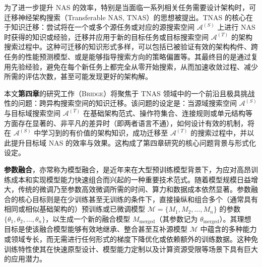 \documentclass[../main.tex]{subfiles}
\begin{document}
为了进一步提升 NAS 的效率，特别是当面临一系列相关任务需要设计架构时，可迁移神经架构搜索（Transferable NAS, TNAS）的思想被提出。TNAS 的核心在于知识迁移：尝试将在一个或多个源任务或对应的源搜索空间 $\mathcal{A}^{(S)}$ 上进行 NAS 时获得的知识或经验，迁移并应用于新的目标任务或目标搜索空间 $\mathcal{A}^{(T)}$ 的架构搜索过程中。这种可迁移的知识形式多样，可以包括已被验证有效的架构构件、跨任务的性能预测模型、或是能够指导搜索方向的策略偏置等。其最终目的是通过复用先验经验，避免在每个新任务上都完全从零开始搜索，从而加速收敛过程、减少所需的评估次数，甚至可能发现更好的架构解。

本文\textbf{第四章}的研究工作（\textsc{Bridge}）将聚焦于 TNAS 领域中的一个前沿且极具挑战性的问题：跨异构搜索空间的知识迁移。该问题的设定是：当源域搜索空间 $\mathcal{A}^{(S)}$ 与目标域搜索空间 $\mathcal{A}^{(T)}$ 在基础架构范式、操作符集合、连接规则或单元结构等方面存在显著的、非平凡的差异时（即两者语言不通），如何设计有效的机制，将在 $\mathcal{A}^{(S)}$ 中学习到的有价值的架构知识，成功迁移至 $\mathcal{A}^{(T)}$ 的搜索过程中，并以此提升目标域 NAS 的效率与效果。这构成了第四章研究的核心问题背景与形式化设定。


\textbf{参数融合}，亦常称为模型融合，是近年来在大型预训练模型背景下，为应对高昂训练成本和实现模型能力快速组合而兴起的一种重要技术范式。随着模型规模日益增大，传统的微调乃至参数高效微调所需的时间、算力和数据成本依然显著。参数融合的核心目标则是在少训练甚至无训练的条件下，直接操纵和组合多个（通常具有相同或相似基础架构的）预训练或已微调模型 $\mathcal{M} = \{M_1, M_2, \dots, M_n\}$ 的参数 $\{\theta_1, \theta_2, \dots, \theta_n\}$，以生成一个新的融合模型 $M_\mathrm{merged}$（其参数记为 $\theta_\mathrm{merged}$）。其理想目标是使该融合模型能够有效地继承、整合甚至互补源模型 $\mathcal{M}$ 中蕴含的多种能力或领域专长，而无需进行任何形式的梯度下降优化或依赖额外的训练数据。这种免训练特性使其在快速原型设计、模型能力定制以及计算资源受限等场景下具有巨大的应用潜力。
\end{document}
